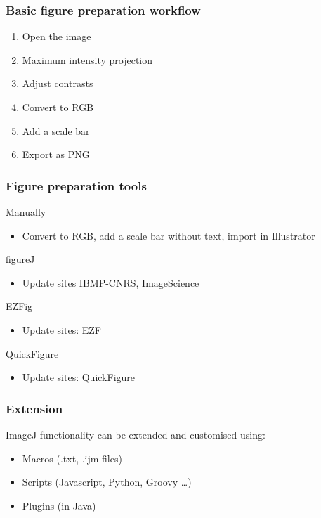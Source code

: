 \documentclass[ignorenonframetext,aspectratio=169,10pt,xcolor=table]{beamer}
\begin{document}
\begin{frame} \frametitle{Basic figure preparation workflow}
  \begin{enumerate}
  \item Open the image
  \item Maximum intensity projection
  \item Adjust contrasts
  \item Convert to RGB
  \item Add a scale bar
  \item Export as PNG
  \end{enumerate}
\end{frame}

\begin{frame} \frametitle{Figure preparation tools}
  \begin{block}{Manually}
    \begin{itemize}
    \item Convert to RGB, add a scale bar without text, import in
      Illustrator
    \end{itemize}
  \end{block}
  \begin{block}{figureJ}
    \begin{itemize}
    \item Update sites IBMP-CNRS, ImageScience
    \end{itemize}
  \end{block}

  \begin{block}{EZFig}
    \begin{itemize}
    \item Update sites: EZF
    \end{itemize}
  \end{block}


  \begin{block}{QuickFigure}
    \begin{itemize}
    \item Update sites: QuickFigure
    \end{itemize}
  \end{block} 
\end{frame}

\begin{frame} \frametitle{Extension}

  ImageJ functionality can be extended and customised using:
  \begin{itemize}
  \item Macros (.txt, .ijm files)
  \item Scripts (Javascript, Python, Groovy \dots)
  \item Plugins (in Java)
  \end{itemize}
\end{frame}
\end{document}
